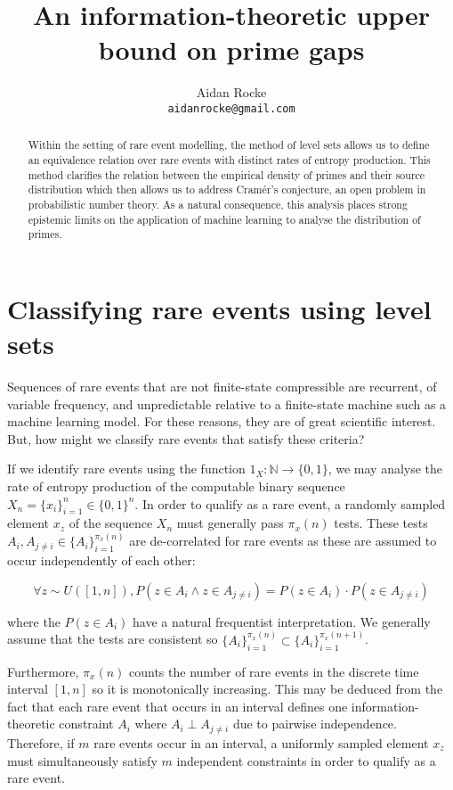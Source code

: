 \documentclass{article}
\title{An information-theoretic upper bound on prime gaps}
\author{%
  Aidan Rocke\\
  \texttt{aidanrocke@gmail.com} \\
}
\begin{document}
\maketitle

\begin{abstract}
Within the setting of rare event modelling, the method of level sets allows 
us to define an equivalence relation over rare events with distinct rates of entropy production. This method clarifies the relation between the empirical density of primes and their source distribution which then allows us to address Cramér's conjecture, an open problem in probabilistic number theory. As a natural consequence, this analysis places strong epistemic limits on the
application of machine learning to analyse the distribution of primes.
\end{abstract}

\section{Classifying rare events using level sets}
 
Sequences of rare events that are not finite-state compressible are recurrent, of variable frequency, and unpredictable relative to a finite-state machine such as a machine learning model. For these reasons, they are of great scientific interest. But, how might we classify rare events that satisfy these criteria? 

If we identify rare events using the function $1_X: \mathbb{N} \rightarrow \{0,1\}$, we may analyse the rate of
entropy production of the computable binary sequence $X_n = \{x_i\}_{i=1}^n \in \{0,1\}^n$. In order to qualify as a rare event, a randomly sampled element $x_z$ of the sequence $X_n$ must generally
pass $\pi_x(n)$ tests. These tests $A_i, A_{j \neq i} \in \{A_i\}_{i=1}^{\pi_x(n)}$ are de-correlated for rare events as these are assumed to occur independently of each other: 

\begin{equation}
\forall z \sim U([1,n]), P(z \in A_i \land z \in A_{j \neq i}) = P(z \in A_i ) \cdot P(z \in A_{j \neq i})
\end{equation}

where the $P(z \in A_i )$ have a natural frequentist interpretation. We generally assume that the tests are consistent so $\{A_i\}_{i=1}^{\pi_x(n)} \subset \{A_i\}_{i=1}^{\pi_x(n+1)}$. 

Furthermore, $\pi_{x}(n)$ counts the number of rare events in the discrete time interval $[1,n]$ so it is monotonically increasing. This may be deduced from the fact that each rare event that occurs in an interval defines one information-theoretic constraint $A_i$ where $A_i \perp A_{j \neq i}$ due to pairwise independence. Therefore, if $m$ rare events occur in an interval, a uniformly sampled element $x_z$ must simultaneously satisfy $m$ independent constraints in order to qualify as a rare event.
\end{document}
